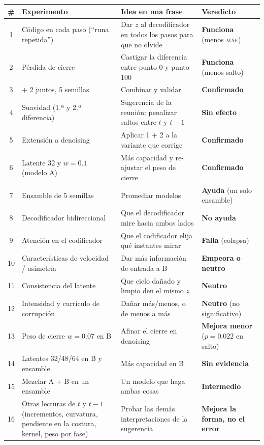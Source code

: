 \documentclass[11pt,a4paper]{article}
\newcommand{\mae}{\textsc{mae}}
\begin{document}
\small
\begin{tabularx}{\textwidth}{@{}c>{\raggedright\arraybackslash}p{3.5cm}>{\raggedright\arraybackslash}X>{\raggedright\arraybackslash}p{2.7cm}@{}}
\toprule
\# & Experimento & Idea en una frase & Veredicto \\
\midrule
1 & Código en cada paso (``runa repetida'') & Dar $z$ al decodificador en todos los pasos para que no olvide & \textcolor{verde}{\textbf{Funciona}} (menos \mae{}) \\
2 & Pérdida de cierre & Castigar la diferencia entre punto 0 y punto 100 & \textcolor{verde}{\textbf{Funciona}} (menos salto) \\
3 & 1 + 2 juntos, 5 semillas & Combinar y validar & \textcolor{verde}{\textbf{Confirmado}} \\
4 & Suavidad (1.ª y 2.ª diferencia) & Sugerencia de la reunión: penalizar saltos entre $t$ y $t-1$ & \textcolor{rojo}{\textbf{Sin efecto}} \\
5 & Extensión a denoising & Aplicar 1 + 2 a la variante que corrige & \textcolor{verde}{\textbf{Confirmado}} \\
6 & Latente 32 y $w=0.1$ (modelo A) & Más capacidad y re-ajustar el peso de cierre & \textcolor{verde}{\textbf{Confirmado}} \\
7 & Ensamble de 5 semillas & Promediar modelos & \textcolor{verde}{\textbf{Ayuda}} (un solo ensamble) \\
8 & Decodificador bidireccional & Que el decodificador mire hacia ambos lados & \textcolor{rojo}{\textbf{No ayuda}} \\
9 & Atención en el codificador & Que el codificador elija qué instantes mirar & \textcolor{rojo}{\textbf{Falla}} (colapsa) \\
10 & Características de velocidad / asimetría & Dar más información de entrada a B & \textcolor{rojo}{\textbf{Empeora o neutro}} \\
11 & Consistencia del latente & Que ciclo dañado y limpio den el mismo $z$ & \textcolor{rojo}{\textbf{Neutro}} \\
12 & Intensidad y currículo de corrupción & Dañar más/menos, o de menos a más & \textcolor{naranja}{\textbf{Neutro}} (no significativo) \\
13 & Peso de cierre $w=0.07$ en B & Afinar el cierre en denoising & \textcolor{naranja}{\textbf{Mejora menor}} ($p=0.022$ en salto) \\
14 & Latentes 32/48/64 en B y ensamble & Más capacidad en B & \textcolor{naranja}{\textbf{Sin evidencia}} \\
15 & Mezclar A + B en un ensamble & Un modelo que haga ambas cosas & \textcolor{rojo}{\textbf{Intermedio}} \\
16 & Otras lecturas de $t$ y $t-1$ (incrementos, curvatura, pendiente en la costura, kernel, peso por fase) & Probar las demás interpretaciones de la sugerencia & \textcolor{naranja}{\textbf{Mejora la forma, no el error}} \\
\bottomrule
\end{tabularx}
\normalsize
\end{document}
